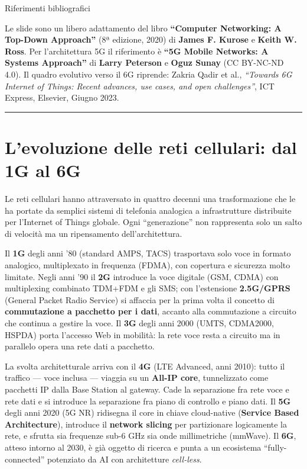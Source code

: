 \documentclass[
  italian,
  openany]{book}
\begin{document}
\begin{calloutnote}{Riferimenti bibliografici}

Le slide sono un libero adattamento del libro \textbf{``Computer
Networking: A Top-Down Approach''} (8ª edizione, 2020) di \textbf{James
F. Kurose} e \textbf{Keith W. Ross}. Per l'architettura 5G il
riferimento è \textbf{``5G Mobile Networks: A Systems Approach''} di
\textbf{Larry Peterson} e \textbf{Oguz Sunay} (CC BY-NC-ND 4.0). Il
quadro evolutivo verso il 6G riprende: Zakria Qadir et al.,
\emph{``Towards 6G Internet of Things: Recent advances, use cases, and
open challenges''}, ICT Express, Elsevier, Giugno 2023.

\end{calloutnote}

\begin{center}\rule{0.5\linewidth}{0.5pt}\end{center}

\section{L'evoluzione delle reti cellulari: dal 1G al
6G}\label{levoluzione-delle-reti-cellulari-dal-1g-al-6g}

Le reti cellulari hanno attraversato in quattro decenni una
trasformazione che le ha portate da semplici sistemi di telefonia
analogica a infrastrutture distribuite per l'Internet of Things globale.
Ogni ``generazione'' non rappresenta solo un salto di velocità ma un
ripensamento dell'architettura.

Il \textbf{1G} degli anni '80 (standard AMPS, TACS) trasportava solo
voce in formato analogico, multiplexato in frequenza (FDMA), con
copertura e sicurezza molto limitate. Negli anni '90 il \textbf{2G}
introduce la voce digitale (GSM, CDMA) con multiplexing combinato
TDM+FDM e gli SMS; con l'estensione \textbf{2.5G/GPRS} (General Packet
Radio Service) si affaccia per la prima volta il concetto di
\textbf{commutazione a pacchetto per i dati}, accanto alla commutazione
a circuito che continua a gestire la voce. Il \textbf{3G} degli anni
2000 (UMTS, CDMA2000, HSPDA) porta l'accesso Web in mobilità: la rete
voce resta a circuito ma in parallelo opera una rete dati a pacchetto.

La svolta architetturale arriva con il \textbf{4G} (LTE Advanced, anni
2010): tutto il traffico --- voce inclusa --- viaggia su un
\textbf{All-IP core}, tunnelizzato come pacchetti IP dalla Base Station
al gateway. Cade la separazione fra rete voce e rete dati e si introduce
la separazione fra piano di controllo e piano dati. Il \textbf{5G} degli
anni 2020 (5G NR) ridisegna il core in chiave cloud-native
(\textbf{Service Based Architecture}), introduce il \textbf{network
slicing} per partizionare logicamente la rete, e sfrutta sia frequenze
sub-6 GHz sia onde millimetriche (mmWave). Il \textbf{6G}, atteso
intorno al 2030, è già oggetto di ricerca e punta a un ecosistema
``fully-connected'' potenziato da AI con architetture \emph{cell-less}.
\end{document}
